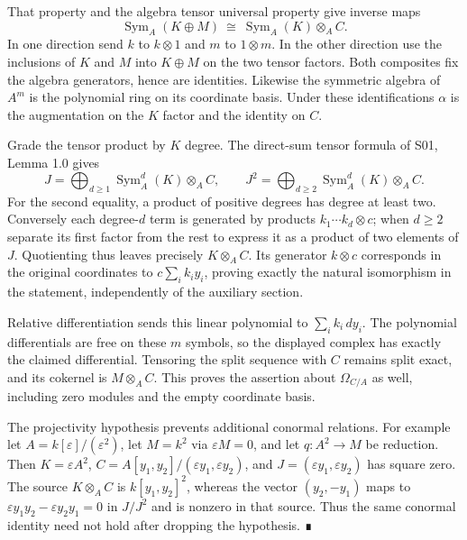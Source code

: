 \documentclass[11pt,a4paper,openany]{report}
\begin{document}
That property and the algebra tensor universal property give inverse maps \[
\operatorname{Sym}_A(K\oplus M)
\ \cong\ \operatorname{Sym}_A(K)\otimes_A C.
\] In one direction send \(k\) to \(k\otimes1\) and \(m\) to \(1\otimes m\). In the other direction use the inclusions of \(K\) and \(M\) into \(K\oplus M\) on the two tensor factors. Both composites fix the algebra generators, hence are identities. Likewise the symmetric algebra of \(A^m\) is the polynomial ring on its coordinate basis. Under these identifications \(\alpha\) is the augmentation on the \(K\) factor and the identity on \(C\).

Grade the tensor product by \(K\) degree. The direct-sum tensor formula of S01, Lemma 1.0 gives \[
J=\bigoplus_{d\ge1}\operatorname{Sym}_A^d(K)\otimes_A C,
\qquad
J^2=\bigoplus_{d\ge2}\operatorname{Sym}_A^d(K)\otimes_A C.
\] For the second equality, a product of positive degrees has degree at least two. Conversely each degree-\(d\) term is generated by products \(k_1\cdots k_d\otimes c\); when \(d\ge2\) separate its first factor from the rest to express it as a product of two elements of \(J\). Quotienting thus leaves precisely \(K\otimes_A C\). Its generator \(k\otimes c\) corresponds in the original coordinates to \(c\sum_i k_i y_i\), proving exactly the natural isomorphism in the statement, independently of the auxiliary section.

Relative differentiation sends this linear polynomial to \(\sum_i k_i\,dy_i\). The polynomial differentials are free on these \(m\) symbols, so the displayed complex has exactly the claimed differential. Tensoring the split sequence with \(C\) remains split exact, and its cokernel is \(M\otimes_A C\). This proves the assertion about \(\Omega_{C/A}\) as well, including zero modules and the empty coordinate basis.

The projectivity hypothesis prevents additional conormal relations. For example let \(A=k[\varepsilon]/(\varepsilon^2)\), let \(M=k^2\) via \(\varepsilon M=0\), and let \(q:A^2\to M\) be reduction. Then \(K=\varepsilon A^2\), \(C=A[y_1,y_2]/(\varepsilon y_1,\varepsilon y_2)\), and \(J=(\varepsilon y_1,\varepsilon y_2)\) has square zero. The source \(K\otimes_A C\) is \(k[y_1,y_2]^2\), whereas the vector \((y_2,-y_1)\) maps to \(\varepsilon y_1y_2-\varepsilon y_2y_1=0\) in \(J/J^2\) and is nonzero in that source. Thus the same conormal identity need not hold after dropping the hypothesis. ∎

\label{AG-RG-S05-more-algebra-lemma-degree-p-extension-regular}
\end{document}
